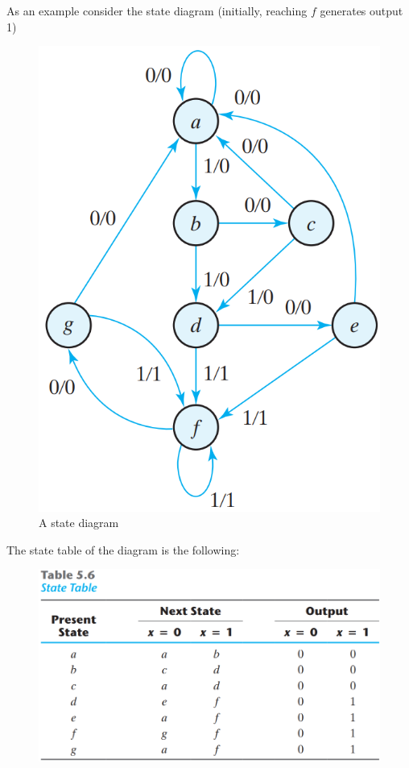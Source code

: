 As an example consider the state diagram (initially, reaching $f$ generates output 1)
\begin{figure}[H]
  \centering
  \includegraphics[width=.7\linewidth]{img/fig-5.25.png}
  \caption{A state diagram}
  \label{fig:fig5.25}
\end{figure}
The state table of the diagram is the following:
\begin{figure}[H]
  \centering
  \includegraphics[width=\linewidth]{img/table-5.6.png}
  \label{table:5.6}
\end{figure}

